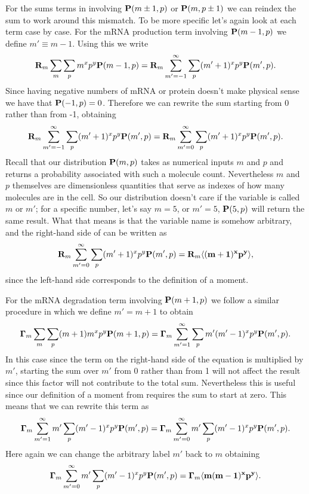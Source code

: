 For the sums terms in  involving $\mathbf{P}(m \pm 1, p)$ or
$\mathbf{P}(m, p \pm 1)$ we can reindex the sum to work around this mismatch. To be
more specific let's again look at each term case by case. For the mRNA
production term involving $\mathbf{P}(m-1, p)$ we define $m' \equiv m - 1$. Using this
we write
\begin{equation}
  \mathbf{R}_m \sum_m \sum_p m^x p^y \mathbf{P}(m-1, p) =
  \mathbf{R}_m \sum_{m' = -1}^\infty \sum_p (m' + 1)^x p^y \mathbf{P}(m', p).
\end{equation}
Since having negative numbers of mRNA or protein doesn't make physical sense
we have that $\mathbf{P}(-1, p) = 0$. Therefore we can rewrite the sum starting from 0
rather than from -1, obtaining
\begin{equation}
  \mathbf{R}_m \sum_{m' = -1}^\infty \sum_p (m' + 1)^x p^y \mathbf{P}(m', p) =
  \mathbf{R}_m \sum_{m'=0}^\infty \sum_p (m' + 1)^x p^y \mathbf{P}(m', p).
  \label{seq_reindex}
\end{equation}
Recall that our distribution $\mathbf{P}(m, p)$ takes as numerical inputs $m$ and $p$
and returns a probability associated with such a molecule count.  Nevertheless
$m$ and $p$ themselves are dimensionless quantities that serve as indexes of how
many molecules are in the cell. So our distribution doesn't care if the variable
is called $m$ or $m'$; for a specific number, let's say $m = 5$, or $m' = 5$,
$\mathbf{P}(5, p)$ will return the same result. What that means is that the variable
name is somehow arbitrary, and the right-hand side of  can be
written as
\begin{equation}
  \mathbf{R}_m \sum_{m'=0}^\infty \sum_p (m' + 1)^x p^y \mathbf{P}(m', p) =
  \mathbf{R}_m \mathbf{\left\langle (m+1)^x p^y \right\rangle},
\end{equation}
since the left-hand side corresponds to the definition of a moment.

For the mRNA degradation term involving $\mathbf{P}(m + 1, p)$ we follow a similar
procedure in which we define $m' = m + 1$ to obtain
\begin{equation}
  \mathbf{\Gamma}_m \sum_m \sum_p (m + 1) m^x p^y \mathbf{P}(m + 1, p) =
  \mathbf{\Gamma}_m \sum_{m' = 1}^\infty \sum_p m' (m' - 1)^x p^y \mathbf{P}(m', p).
\end{equation}
In this case since the term on the right-hand side of the equation is multiplied
by $m'$, starting the sum over $m'$ from 0 rather than from 1 will not affect
the result since this factor will not contribute to the total sum. Nevertheless
this is useful since our definition of a moment from  requires
the sum to start at zero. This means that we can rewrite this term as
\begin{equation}
  \mathbf{\Gamma}_m \sum_{m' = 1}^\infty m' \sum_p (m' - 1)^x p^y \mathbf{P}(m', p) =
  \mathbf{\Gamma}_m \sum_{m' = 0}^\infty m' \sum_p (m' - 1)^x p^y \mathbf{P}(m', p).
\end{equation}
Here again we can change the arbitrary label $m'$ back to $m$ obtaining
\begin{equation}
  \mathbf{\Gamma}_m \sum_{m' = 0}^\infty m' \sum_p (m' - 1)^x p^y \mathbf{P}(m', p) =
  \mathbf{\Gamma}_m \mathbf{\left\langle m (m - 1)^x p^y \right\rangle}.
\end{equation}

